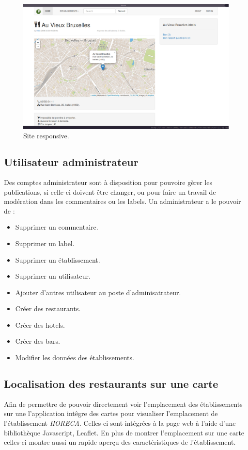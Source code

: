 \documentclass[a4paper,10pt]{article}
\begin{document}
    \begin{figure}[h]
        \centering
        \includegraphics[scale=0.2]{./images/responsive.png}
        \caption{Site responsive.}
    \end{figure}

\subsection{Utilisateur administrateur}
    Des comptes administrateur sont à disposition pour pouvoire gèrer les
    publications, si celle-ci doivent être changer, ou pour faire un travail de
    modération dans les commentaires ou les labels.
    Un administrateur a le pouvoir de :
    \begin{itemize}
        \item Supprimer un commentaire.
        \item Supprimer un label.
        \item Supprimer un établissement.
        \item Supprimer un utilisateur.
        \item Ajouter d'autres utilisateur au poste d'adminisatrateur.
        \item Créer des restaurants.
        \item Créer des hotels.
        \item Créer des bars.
        \item Modifier les données des établissements.
    \end{itemize}
\subsection{Localisation des restaurants sur une carte}
    Afin de permettre de pouvoir directement voir l'emplacement des
    établissements sur une l'application intêgre des cartes pour visualiser
    l'emplacement de l'établissement \emph{HORECA}. Celles-ci sont intégrées à
    la page web à l'aide d'une bibliothèque Javascript, Leaflet.
    En plus de montrer l'emplacement sur une carte celles-ci montre aussi un
    rapide aperçu des caractéristiques de l'établissement.
\end{document}
